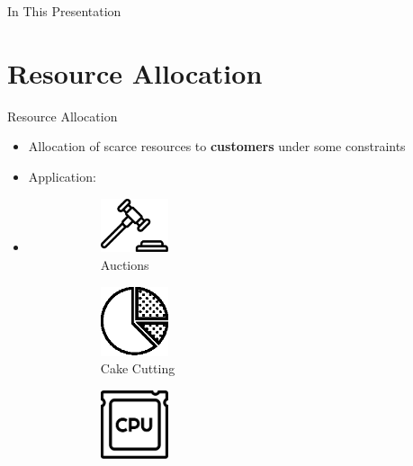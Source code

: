 
\begin{frame}[t,plain]
\titlepage
\end{frame}


\begin{frame}{In This Presentation}
  \tableofcontents
\end{frame}

\section{Resource Allocation}
\frame{\textbf{\insertsection}}


\begin{frame}[t]{Resource Allocation}
    \begin{itemize}
        \item<2-> Allocation of scarce resources to \textbf{customers} under some constraints
        \item<3-> Application:
        \item<4->[ ]
        \begin{figure}
            \begin{subfigure}[b]{0.45\textwidth}  
                \centering
                \includegraphics[width=2cm]{auction.eps}
                \caption*{Auctions}
                \label{fig:my_label}
            \end{subfigure}
            \begin{subfigure}[b]{0.45\textwidth}    
                \centering
                \includegraphics[width=2cm]{pie-chart.eps}
                \caption*{Cake Cutting}
                \label{fig:my_label}
            \end{subfigure}
            \begin{subfigure}[b]{0.45\textwidth}     
                \centering
                \includegraphics[width=2cm]{cpu.eps}

\end{subfigure}
\end{figure}
\end{itemize}
\end{frame}
